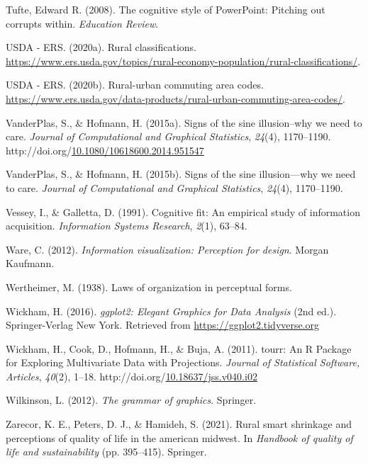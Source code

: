 \documentclass[print]{nuthesis}
\newlength{\cslhangindent}
\newenvironment{CSLReferences}[2]%
{\setlength{\parindent}{0pt}%
\everypar{\setlength{\hangindent}{\cslhangindent}}\ignorespaces}%
{\par}
\begin{document}
\begin{CSLReferences}{1}{0}
\leavevmode{}%
Tufte, Edward R. (2008). The cognitive style of PowerPoint: Pitching out corrupts within. \emph{Education Review}.

\leavevmode{}%
USDA - ERS. (2020a). Rural classifications. \url{https://www.ers.usda.gov/topics/rural-economy-population/rural-classifications/}.

\leavevmode{}%
USDA - ERS. (2020b). Rural-urban commuting area codes. \url{https://www.ers.usda.gov/data-products/rural-urban-commuting-area-codes/}.

\leavevmode{}%
VanderPlas, S., \& Hofmann, H. (2015a). Signs of the sine illusion--why we need to care. \emph{Journal of Computational and Graphical Statistics}, \emph{24}(4), 1170--1190. http://doi.org/\href{https://doi.org/10.1080/10618600.2014.951547}{10.1080/10618600.2014.951547}

\leavevmode{}%
VanderPlas, S., \& Hofmann, H. (2015b). Signs of the sine illusion---why we need to care. \emph{Journal of Computational and Graphical Statistics}, \emph{24}(4), 1170--1190.

\leavevmode{}%
Vessey, I., \& Galletta, D. (1991). Cognitive fit: An empirical study of information acquisition. \emph{Information Systems Research}, \emph{2}(1), 63--84.

\leavevmode{}%
Ware, C. (2012). \emph{Information visualization: Perception for design}. Morgan Kaufmann.

\leavevmode{}%
Wertheimer, M. (1938). Laws of organization in perceptual forms.

\leavevmode{}%
Wickham, H. (2016). \emph{{ggplot2: Elegant Graphics for Data Analysis}} (2nd ed.). Springer-Verlag New York. Retrieved from \url{https://ggplot2.tidyverse.org}

\leavevmode{}%
Wickham, H., Cook, D., Hofmann, H., \& Buja, A. (2011). {tourr: An R Package for Exploring Multivariate Data with Projections}. \emph{Journal of Statistical Software, Articles}, \emph{40}(2), 1--18. http://doi.org/\href{https://doi.org/10.18637/jss.v040.i02}{10.18637/jss.v040.i02}

\leavevmode{}%
Wilkinson, L. (2012). \emph{The grammar of graphics}. Springer.

\leavevmode{}%
Zarecor, K. E., Peters, D. J., \& Hamideh, S. (2021). Rural smart shrinkage and perceptions of quality of life in the american midwest. In \emph{Handbook of quality of life and sustainability} (pp. 395--415). Springer.

\end{CSLReferences}
\end{document}
